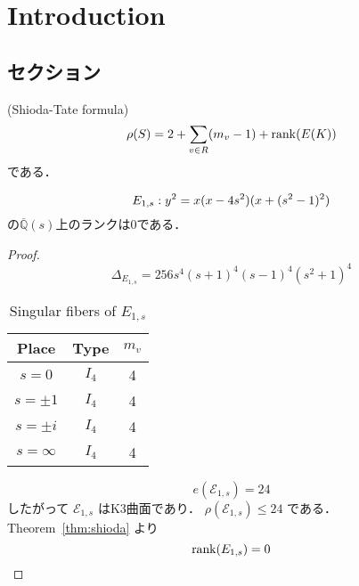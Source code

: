 \documentclass[main]{subfiles}
\begin{document}
\chapter{Introduction}
\section{セクション}

\begin{thm}{(Shioda-Tate formula)}
    \label{thm:shioda}
    \begin{equation}
        \rho (S) = 2 + \sum_{v \in R} (m_{v} - 1) + \operatorname{rank}(E(K))
    \end{equation}
    である．
\end{thm}

\begin{thm}
    \begin{equation}
        \label{eq:E_{1s}}
        E_{1,s}: y^{2} = x(x - 4s^{2})(x + (s^{2} - 1)^{2})
    \end{equation}
    の$\overline{\mathbb{Q}}(s)$上のランクは0である．
\end{thm}
\begin{proof}
    \begin{equation}
        \Delta_{E_{1,s}} = 256s^{4} (s + 1)^{4} (s - 1)^{4} (s^{2} + 1)^{4}
    \end{equation}

    \begin{table}[h]
        \centering
        \caption{Singular fibers of $E_{1,s}$}
        \begin{tabular}{|c|c|c|}
            \hline
            Place      & Type  & $m_v$ \\
            \hline
            $s=0$      & $I_4$ & 4     \\
            $s=\pm 1$  & $I_4$ & 4     \\
            $s=\pm i$  & $I_4$ & 4     \\
            $s=\infty$ & $I_4$ & 4     \\
            \hline
        \end{tabular}
    \end{table}

    \begin{equation}
        e(\mathcal{E}_{1,s}) = 24
    \end{equation}
    したがって $\mathcal{E}_{1,s}$ はK3曲面であり． $\rho(\mathcal{E}_{1,s}) \leq 24$ である．
    Theorem~\ref{thm:shioda} より
    \begin{equation}
        \operatorname{rank}(E_{1,s}) = 0
    \end{equation}
\end{proof}
\end{document}
